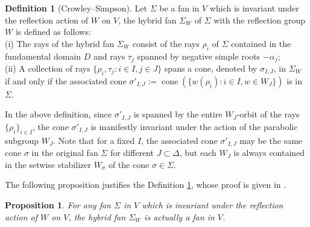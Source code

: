 \documentclass{amsart}
\newtheorem{proposition}[theorem]{Proposition}
\theoremstyle{definition}
\newtheorem{definition}[theorem]{Definition}
\theoremstyle{remark}
\numberwithin{equation}{section}
\begin{document}
\begin{definition}[Crowley--Simpson] \label{def-hybrid fan}
    Let $\Sigma$ be a fan in $V$ which is invariant under the reflection action of $W$ on $V$, the hybrid fan $\Sigma_W$ of $\Sigma$ with the reflection group $W$ is defined as follows: \\
(i) The rays of the hybrid fan $\Sigma_W$ consist of the rays $\rho_i$ of $\Sigma$ contained in the fundamental domain $D$ and rays $\tau_j$ spanned by negative simple roots $-\alpha_j$; \\
(ii) A collection of rays 
$\{\rho_i, \tau_j: i \in I, j \in J\}$ spans a cone, denoted by $\sigma_{I,J}$, 
in $\Sigma_W$ if and only if the associated cone $\sigma'_{I,J} := \operatorname{cone}(\{ w(\rho_i) : i \in I, w \in W_J \})$ is in $\Sigma$.
\end{definition}

In the above definition, since $\sigma'_{I,J}$ is spanned by the entire $W_J$-orbit of the rays $\{\rho_i\}_{i \in I}$, the cone $\sigma'_{I,J}$ is manifestly invariant under the action of the parabolic subgroup $W_J$. Note that for a fixed $I$, the associated cone $\sigma'_{I,J}$ may be the same cone $\sigma$ in the original fan $\Sigma$ for different $J \subset \Delta$, but each $W_J$ is always contained in the setwise stabilizer $W_{\sigma}$ of the cone $\sigma \in \Sigma$.

The following proposition justifies the Definition \ref{def-hybrid fan}, whose proof is given in \cite{Simpson2026more}.
\begin{proposition} \label{prop-justify}
    For any fan $\Sigma$ in $V$ which is invariant under the reflection action of $W$ on $V$, the hybrid fan $\Sigma_W$ is actually a fan in $V$.
\end{proposition}
\end{document}

